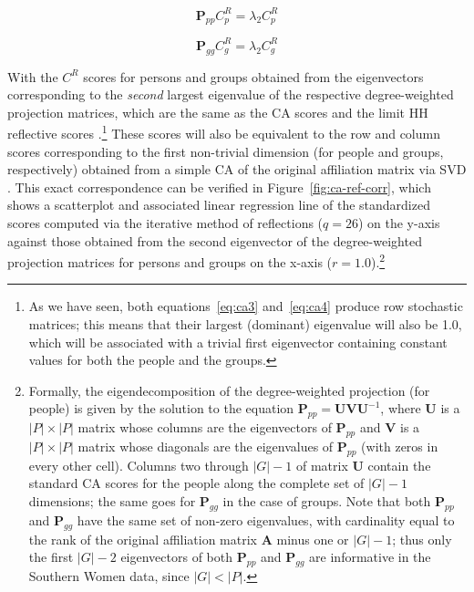 \documentclass[a4paper,fleqn]{cas-sc}
\begin{document}
\begin{equation}
    \mathbf{P}_{pp}C^R_p = \lambda_2C^R_p
    \label{eq:dam1}
\end{equation}

\begin{equation}
    \mathbf{P}_{gg}C^R_g = \lambda_2C^R_g
    \label{eq:dam2}
\end{equation}

With the $C^R$ scores for persons and groups obtained from the eigenvectors corresponding to the \textit{second} largest eigenvalue of the respective degree-weighted projection matrices, which are the same as the CA scores and the limit HH reflective scores \citep{van2021correspondence}.\footnote{As we have seen, both equations~\ref{eq:ca3} and~\ref{eq:ca4} produce row stochastic matrices; this means that their largest (dominant) eigenvalue will also be 1.0, which will be associated with a trivial first eigenvector containing constant values for both the people and the groups.} These scores will also be equivalent to the row and column scores corresponding to the first non-trivial dimension (for people and groups, respectively) obtained from a simple CA of the original affiliation matrix via SVD \citep[398, eq. 9.17]{fouss2016algorithms}. This exact correspondence can be verified in Figure~\ref{fig:ca-ref-corr}, which shows a scatterplot and associated linear regression line of the standardized scores computed via the iterative method of reflections ($q = 26$) on the y-axis against those obtained from the second eigenvector of the degree-weighted projection matrices for persons and groups on the x-axis ($r = 1.0$).\footnote{Formally, the eigendecomposition of the degree-weighted projection (for people) is given by the solution to the equation $\mathbf{P}_{pp} = \mathbf{UVU}^{-1}$, where $\mathbf{U}$ is a $|P| \times |P|$ matrix whose columns are the eigenvectors of $\mathbf{P}_{pp}$ and $\mathbf{V}$ is a $|P| \times |P|$ matrix whose diagonals are the eigenvalues of $\mathbf{P}_{pp}$ (with zeros in every other cell). Columns two through $|G| - 1$ of matrix $\mathbf{U}$ contain the standard CA scores for the people along the complete set of $|G| - 1$ dimensions; the same goes for $\mathbf{P}_{gg}$ in the case of groups. Note that both $\mathbf{P}_{pp}$ and $\mathbf{P}_{gg}$ have the same set of non-zero eigenvalues, with cardinality equal to the rank of the original affiliation matrix $\mathbf{A}$ minus one or $|G| - 1$; thus only the first $|G| - 2$ eigenvectors of both $\mathbf{P}_{pp}$ and $\mathbf{P}_{gg}$ are informative in the Southern Women data, since $|G| < |P|$.}
\end{document}
